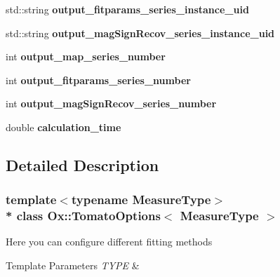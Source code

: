 \begin{DoxyCompactItemize}
\item 
std\+::string {\bfseries output\+\_\+fitparams\+\_\+series\+\_\+instance\+\_\+uid}\hypertarget{class_ox_1_1_tomato_options_a839b746e17a4fe55a60097d5bbec31ae}{}\label{class_ox_1_1_tomato_options_a839b746e17a4fe55a60097d5bbec31ae}

\item 
std\+::string {\bfseries output\+\_\+mag\+Sign\+Recov\+\_\+series\+\_\+instance\+\_\+uid}\hypertarget{class_ox_1_1_tomato_options_ae3c7be563b65ea974512252414ad9916}{}\label{class_ox_1_1_tomato_options_ae3c7be563b65ea974512252414ad9916}

\item 
int {\bfseries output\+\_\+map\+\_\+series\+\_\+number}\hypertarget{class_ox_1_1_tomato_options_a7e2b3b81618591807f85c646e63af34f}{}\label{class_ox_1_1_tomato_options_a7e2b3b81618591807f85c646e63af34f}

\item 
int {\bfseries output\+\_\+fitparams\+\_\+series\+\_\+number}\hypertarget{class_ox_1_1_tomato_options_a7097e80b133056ad6c39d6c36352eced}{}\label{class_ox_1_1_tomato_options_a7097e80b133056ad6c39d6c36352eced}

\item 
int {\bfseries output\+\_\+mag\+Sign\+Recov\+\_\+series\+\_\+number}\hypertarget{class_ox_1_1_tomato_options_a1c61136babab1084781ff92d44a55e1f}{}\label{class_ox_1_1_tomato_options_a1c61136babab1084781ff92d44a55e1f}

\item 
double {\bfseries calculation\+\_\+time}\hypertarget{class_ox_1_1_tomato_options_aeb6559adc5bf520acd9e09efcfc96d96}{}\label{class_ox_1_1_tomato_options_aeb6559adc5bf520acd9e09efcfc96d96}

\end{DoxyCompactItemize}


\subsection{Detailed Description}
\subsubsection*{template$<$typename Measure\+Type$>$\\*
class Ox\+::\+Tomato\+Options$<$ Measure\+Type $>$}

Here you can configure different fitting methods 
\begin{DoxyTemplParams}{Template Parameters}
{\em T\+Y\+PE} & \\
\hline
\end{DoxyTemplParams}


